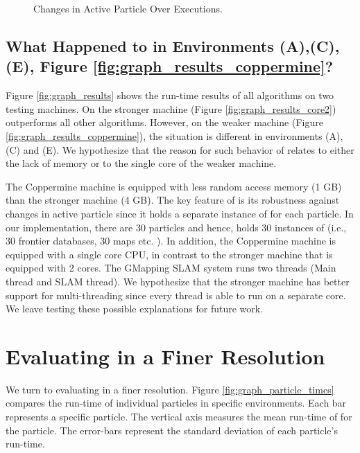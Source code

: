 \begin{figure}[htp]
{ }
 \caption{Changes in Active Particle Over Executions.}
 \label{fig:graph_active_particle_changes}
\end{figure}

\subsection{What Happened to \WFDIP in Environments (A),(C),(E), Figure
\ref{fig:graph_results_coppermine}?}
\label{section:what_happend_to_wfdip_on_weak_machine}
Figure \ref{fig:graph_results} shows the run-time results of all algorithms on
two testing machines. On the stronger machine (Figure
\ref{fig:graph_results_core2}) \WFDIP outperforms all other algorithms. However,
on the weaker machine (Figure \ref{fig:graph_results_coppermine}), the situation
is different in environments (A),(C) and (E). We hypothesize that the reason
for such behavior of \WFDIP relates to either the lack of memory or to the
single core of the weaker machine.

The Coppermine machine is equipped with less random access memory (1 GB) than
the stronger machine (4 GB). The key feature of \WFDIP is
its robustness against changes in active particle since it holds a separate
instance of \WFDINC for each particle. In our implementation, there
are 30 particles and hence, \WFDIP holds 30 instances of \WFDINC (i.e., 30
frontier databases, 30 maps etc. ). In addition, the Coppermine machine is
equipped with a single core CPU, in contrast to the stronger machine that is
equipped with 2 cores. The GMapping SLAM system runs two threads (Main thread
and SLAM thread). We hypothesize that the stronger machine has better support
for multi-threading since every thread is able to run on a separate core.
We leave testing these possible explanations for future work.

\section{Evaluating \FFD in a Finer Resolution}
\label{section:experiments_ffd_finer_resolution}
We turn to evaluating \FFD in a finer resolution.
Figure \ref{fig:graph_particle_times} compares the run-time of individual particles
in specific environments. Each bar represents a specific particle. The vertical axis measures the
mean run-time of \FFD for the particle. The
error-bars represent the standard deviation of each particle's run-time. 

